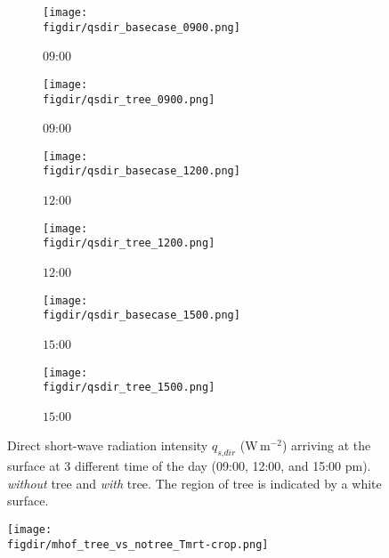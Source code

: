 \begin{figure}[p]
	\centering
	\begin{subfigure}[b]{.45\linewidth}
		\texttt{[image: \\figdir/qsdir\_basecase\_0900.png]}
		\caption{$09$:$00$}\label{fig:qrdir_basecase_0900}
	\end{subfigure}\hspace*{\fill}
	\begin{subfigure}[b]{.45\linewidth}
		\texttt{[image: \\figdir/qsdir\_tree\_0900.png]}
		\caption{$09$:$00$}\label{fig:qrdir_tree_0900}
	\end{subfigure}
	
	\medskip
	\begin{subfigure}[b]{.45\linewidth}
		\texttt{[image: \\figdir/qsdir\_basecase\_1200.png]}
		\caption{$12$:$00$}\label{fig:qsdir_basecase_1200}
	\end{subfigure}\hspace*{\fill}
	\begin{subfigure}[b]{.45\linewidth}
		\texttt{[image: \\figdir/qsdir\_tree\_1200.png]}
		\caption{$12$:$00$}\label{fig:qsdir_tree_1200}
	\end{subfigure}
	
	\medskip
	\begin{subfigure}[b]{.45\linewidth}
		\texttt{[image: \\figdir/qsdir\_basecase\_1500.png]}
		\caption{$15$:$00$}\label{fig:qsdir_basecase_1500}
	\end{subfigure}\hspace*{\fill}
	\begin{subfigure}[b]{.45\linewidth}
		\texttt{[image: \\figdir/qsdir\_tree\_1500.png]}
		\caption{$15$:$00$}\label{fig:qsdir_tree_1500}
	\end{subfigure}
	
	\caption{Direct short-wave radiation intensity $q_{\textit{s,dir}}$ (W\,m$^{-2}$) arriving at the surface at 3 different time of the day (09:00, 12:00, and 15:00 pm).  \textit{without} tree and  \textit{with} tree. The region of tree is indicated by a white surface. }
	\label{fig:qsdir_muensterhof}	
\end{figure}


\begin{figure}[p]
	\centering
	\texttt{[image: \\figdir/mhof\_tree\_vs\_notree\_Tmrt-crop.png]}
	\caption{}
	\label{fig:Tmrtdiff_muensterhof}
\end{figure}

